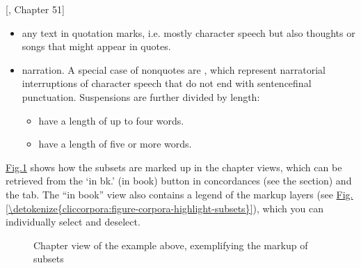 \documentclass[letterpaper,10pt,english]{sphinxmanual}
\begin{document}
\sphinxAtStartPar
{[}, Chapter 51{]}
\begin{itemize}
\item {} 
\sphinxAtStartPar
{} \textendash{} any text in quotation marks, i.e. mostly character
speech but also thoughts or songs that might appear in quotes.

\item {} 
\sphinxAtStartPar
{} \textendash{} narration. A special case of non\sphinxhyphen{}quotes are
, which represent narratorial interruptions of
character speech that do not end with sentence\sphinxhyphen{}final punctuation.
Suspensions are further divided by length:
\begin{itemize}
\item {} 
\sphinxAtStartPar
{} have a length of up to four words.

\item {} 
\sphinxAtStartPar
{} have a length of five or more words.

\end{itemize}

\end{itemize}

\sphinxAtStartPar
\hyperref[\detokenize{cliccorpora:figure-corpora-markupsubsets}]{Fig.\@ \ref{\detokenize{cliccorpora:figure-corpora-markupsubsets}}} shows how the subsets are marked
up in the chapter views, which can be retrieved from the ‘in bk.’ (in
book) button in concordances (see the {\hyperref[\detokenize{clicanalysis/concordance:concordance}]{}} section) and
the {\hyperref[\detokenize{clicanalysis/texts:texts}]{}} tab. The “in book” view also contains a legend of the
markup layers (see \hyperref[\detokenize{cliccorpora:figure-corpora-highlight-subsets}]{Fig.\@ \ref{\detokenize{cliccorpora:figure-corpora-highlight-subsets}}}), which
you can individually select and deselect.

\begin{figure}[htbp]
\centering
\capstart

\noindent{}
\caption{Chapter view of the example above, exemplifying the mark\sphinxhyphen{}up of
subsets}\label{\detokenize{cliccorpora:id7}}\label{\detokenize{cliccorpora:figure-corpora-markupsubsets}}\end{figure}
\end{document}

